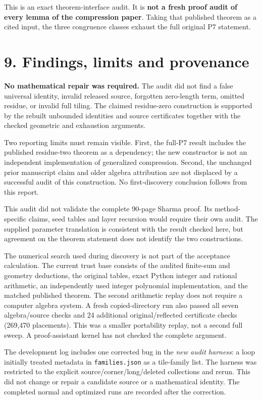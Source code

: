 \documentclass[
  11pt,
]{article}
\begin{document}
This is an exact theorem-interface audit. It is \textbf{not a fresh
proof audit of every lemma of the compression paper}. Taking that
published theorem as a cited input, the three congruence classes exhaust
the full original P7 statement.

\section{9. Findings, limits and
provenance}\label{findings-limits-and-provenance}

\textbf{No mathematical repair was required.} The audit did not find a
false universal identity, invalid released source, forgotten zero-length
term, omitted residue, or invalid full tiling. The claimed residue-zero
construction is supported by the rebuilt unbounded identities and source
certificates together with the checked geometric and exhaustion
arguments.

Two reporting limits must remain visible. First, the full-P7 result
includes the published residue-two theorem as a dependency; the new
constructor is not an independent implementation of generalized
compression. Second, the unchanged prior manuscript claim and older
algebra attribution are not displaced by a successful audit of this
construction. No first-discovery conclusion follows from this report.

This audit did not validate the complete 90-page Sharma proof. Its
method-specific claims, seed tables and layer recursion would require
their own audit. The supplied parameter translation is consistent with
the result checked here, but agreement on the theorem statement does not
identify the two constructions.

The numerical search used during discovery is not part of the acceptance
calculation. The current trust base consists of the audited finite-sum
and geometry deductions, the original tables, exact Python integer and
rational arithmetic, an independently used integer polynomial
implementation, and the matched published theorem. The second arithmetic
replay does not require a computer algebra system. A fresh
copied-directory run also passed all seven algebra/source checks and 24
additional original/reflected certificate checks (269,470 placements).
This was a smaller portability replay, not a second full sweep. A
proof-assistant kernel has not checked the complete argument.

The development log includes one corrected bug in the \emph{new audit
harness}: a loop initially treated metadata in \texttt{families.json} as
a tile-family list. The harness was restricted to the explicit
source/corner/long/deleted collections and rerun. This did not change or
repair a candidate source or a mathematical identity. The completed
normal and optimized runs are recorded after the correction.
\end{document}
